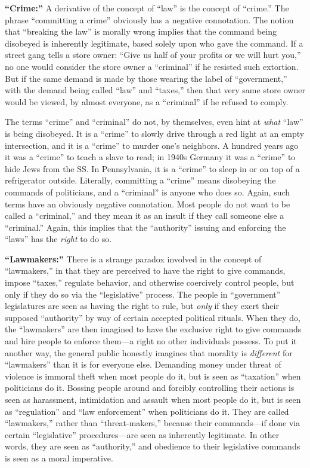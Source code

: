 \documentclass{book}
\begin{document}
\textbf{\enquote{Crime:}} A derivative of the concept of \enquote{law} is the concept of \enquote{crime.} The phrase \enquote{committing a crime} obviously has a negative connotation. The notion that \enquote{breaking the law} is morally wrong implies that the command being disobeyed is inherently legitimate, based solely upon who gave the command. If a street gang tells a store owner: \enquote{Give us half of your profits or we will hurt you,} no one would consider the store owner a \enquote{criminal} if he resisted such extortion. But if the same demand is made by those wearing the label of \enquote{government,} with the demand being called \enquote{law} and \enquote{taxes,} then that very same store owner would be viewed, by almost everyone, as a \enquote{criminal} if he refused to comply.

The terms \enquote{crime} and \enquote{criminal} do not, by themselves, even hint at \emph{what} \enquote{law} is being disobeyed. It is a \enquote{crime} to slowly drive through a red light at an empty intersection, and it is a \enquote{crime} to murder one's neighbors. A hundred years ago it was a \enquote{crime} to teach a slave to read; in 1940s Germany it was a \enquote{crime} to hide Jews from the SS. In Pennsylvania, it is a \enquote{crime} to sleep in or on top of a refrigerator outside. Literally, committing a \enquote{crime} means disobeying the commands of politicians, and a \enquote{criminal} is anyone who does so. Again, such terms have an obviously negative connotation. Most people do not want to be called a \enquote{criminal,} and they mean it as an insult if they call someone else a \enquote{criminal.} Again, this implies that the \enquote{authority} issuing and enforcing the \enquote{laws} has the \emph{right} to do so.

\textbf{\enquote{Lawmakers:}} There is a strange paradox involved in the concept of \enquote{lawmakers,} in that they are perceived to have the right to give commands, impose \enquote{taxes,} regulate behavior, and otherwise coercively control people, but only if they do so via the \enquote{legislative} process. The people in \enquote{government} legislatures are seen as having the right to rule, but \emph{only} if they exert their supposed \enquote{authority} by way of certain accepted political rituals. When they do, the \enquote{lawmakers} are then imagined to have the exclusive right to give commands and hire people to enforce them---a right no other individuals possess. To put it another way, the general public honestly imagines that morality is \emph{different} for \enquote{lawmakers} than it is for everyone else. Demanding money under threat of violence is immoral theft when most people do it, but is seen as \enquote{taxation} when politicians do it. Bossing people around and forcibly controlling their actions is seen as harassment, intimidation and assault when most people do it, but is seen as \enquote{regulation} and \enquote{law enforcement} when politicians do it. They are called \enquote{lawmakers,} rather than \enquote{threat-makers,} because their commands---if done via certain \enquote{legislative} procedures---are seen as inherently legitimate. In other words, they are seen as \enquote{authority,} and obedience to their legislative commands is seen as a moral imperative.
\end{document}
